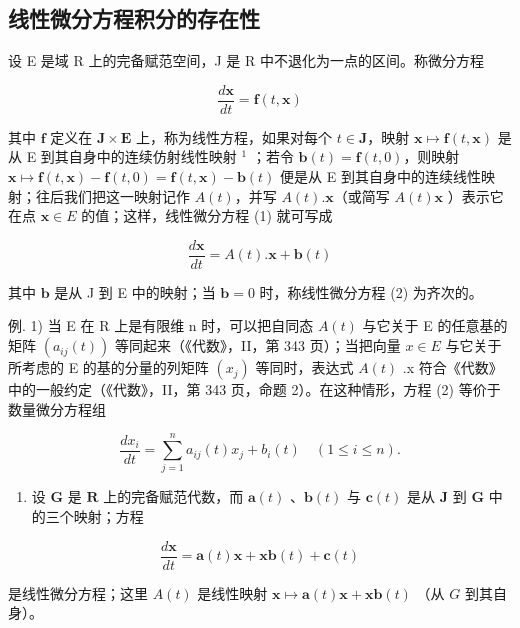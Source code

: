 \subsection{线性微分方程积分的存在性}

设 E 是域 R 上的完备赋范空间，J 是 R 中不退化为一点的区间。称微分方程

\[
{\frac {d \mathbf {x}}{d t}} = \mathbf {f} (t, \mathbf {x})\tag{1}
\]

其中 \(\mathbf{f}\) 定义在 \(\mathbf{J} \times \mathbf{E}\) 上，称为线性方程，如果对每个 \(t \in \mathbf{J}\)，映射 \(\mathbf{x} \mapsto \mathbf{f}(t, \mathbf{x})\) 是从 E 到其自身中的连续仿射线性映射 \(^1\) ；若令 \(\mathbf{b}(t) = \mathbf{f}(t, 0)\)，则映射 \(\mathbf{x} \mapsto \mathbf{f}(t, \mathbf{x}) - \mathbf{f}(t, 0) = \mathbf{f}(t, \mathbf{x}) - \mathbf{b}(t)\) 便是从 E 到其自身中的连续线性映射；往后我们把这一映射记作 \(A(t)\)，并写 \(A(t).\mathbf{x}\)（或简写 \(A(t)\mathbf{x}\) ）表示它在点 \(\mathbf{x} \in E\) 的值；这样，线性微分方程 (1) 就可写成

\[
{\frac {d \mathbf {x}}{d t}} = A (t). \mathbf {x} + \mathbf {b} (t)\tag{2}
\]

其中 \(\mathbf{b}\) 是从 J 到 E 中的映射；当 \(\mathbf{b} = 0\) 时，称线性微分方程 (2) 为齐次的。

例. 1) 当 E 在 R 上是有限维 n 时，可以把自同态 \(A(t)\) 与它关于 E 的任意基的矩阵 \(\left(a_{ij}(t)\right)\) 等同起来（《代数》，II，第 343 页）；当把向量 \(x \in E\) 与它关于所考虑的 E 的基的分量的列矩阵 \(\left(x_{j}\right)\) 等同时，表达式 \(A(t)\) .x 符合《代数》中的一般约定（《代数》，II，第 343 页，命题 2）。在这种情形，方程 (2) 等价于数量微分方程组

\[
\frac {d x _ {i}}{d t} = \sum_ {j = 1} ^ {n} a _ {i j} (t) x _ {j} + b _ {i} (t) \quad (1 \leqslant i \leqslant n).\tag{3}
\]

\begin{enumerate}
\def\labelenumi{\arabic{enumi})}
\setcounter{enumi}{1}
\tightlist
\item
  设 \(\mathbf{G}\) 是 \(\mathbf{R}\) 上的完备赋范代数，而 \(\mathbf{a}(t)\) 、\(\mathbf{b}(t)\) 与 \(\mathbf{c}(t)\) 是从 \(\mathbf{J}\) 到 \(\mathbf{G}\) 中的三个映射；方程
\end{enumerate}

\[
\frac {d \mathbf {x}}{d t} = \mathbf {a} (t) \mathbf {x} + \mathbf {x b} (t) + \mathbf {c} (t)
\]

是线性微分方程；这里 \(A(t)\) 是线性映射 \(\mathbf{x} \mapsto \mathbf{a}(t)\mathbf{x} + \mathbf{x}\mathbf{b}(t)\) （从 \(G\) 到其自身）。

